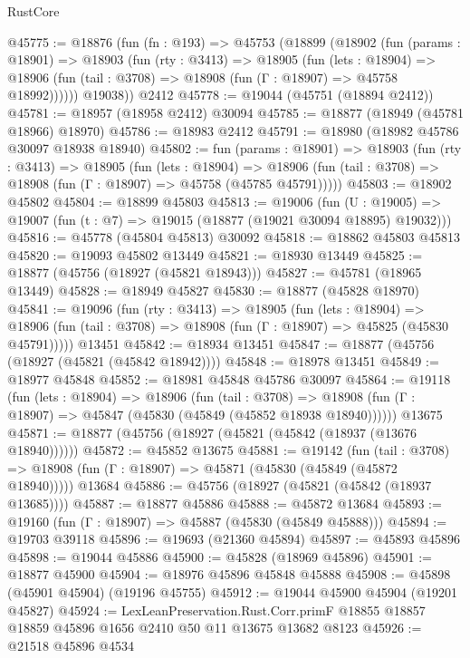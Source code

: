 \begin{lexlean}{RustCore}
\begin{coremodule}
@45775 := @18876
    (fun (fn : @193) =>
    @45753
      (@18899
        (@18902
          (fun (params : @18901) =>
          @18903
            (fun (rty : @3413) =>
            @18905
              (fun (lets : @18904) =>
              @18906 (fun (tail : @3708) => @18908 (fun (Γ : @18907) => @45758 @18992))))))
        @19038))
    @2412
@45778 := @19044 (@45751 (@18894 @2412))
@45781 := @18957 (@18958 @2412) @30094
@45785 := @18877 (@18949 (@45781 @18966) @18970)
@45786 := @18983 @2412
@45791 := @18980 (@18982 @45786 @30097 @18938 @18940)
@45802 := fun (params : @18901) =>
  @18903
    (fun (rty : @3413) =>
    @18905
      (fun (lets : @18904) =>
      @18906 (fun (tail : @3708) => @18908 (fun (Γ : @18907) => @45758 (@45785 @45791)))))
@45803 := @18902 @45802
@45804 := @18899 @45803
@45813 := @19006
    (fun (U : @19005) => @19007 (fun (t : @7) => @19015 (@18877 (@19021 @30094 @18895) @19032)))
@45816 := @45778 (@45804 @45813) @30092
@45818 := @18862 @45803 @45813
@45820 := @19093 @45802 @13449
@45821 := @18930 @13449
@45825 := @18877 (@45756 (@18927 (@45821 @18943)))
@45827 := @45781 (@18965 @13449)
@45828 := @18949 @45827
@45830 := @18877 (@45828 @18970)
@45841 := @19096
    (fun (rty : @3413) =>
    @18905
      (fun (lets : @18904) =>
      @18906 (fun (tail : @3708) => @18908 (fun (Γ : @18907) => @45825 (@45830 @45791)))))
    @13451
@45842 := @18934 @13451
@45847 := @18877 (@45756 (@18927 (@45821 (@45842 @18942))))
@45848 := @18978 @13451
@45849 := @18977 @45848
@45852 := @18981 @45848 @45786 @30097
@45864 := @19118
    (fun (lets : @18904) =>
    @18906
      (fun (tail : @3708) =>
      @18908 (fun (Γ : @18907) => @45847 (@45830 (@45849 (@45852 @18938 @18940))))))
    @13675
@45871 := @18877 (@45756 (@18927 (@45821 (@45842 (@18937 (@13676 @18940))))))
@45872 := @45852 @13675
@45881 := @19142
    (fun (tail : @3708) => @18908 (fun (Γ : @18907) => @45871 (@45830 (@45849 (@45872 @18940)))))
    @13684
@45886 := @45756 (@18927 (@45821 (@45842 (@18937 @13685))))
@45887 := @18877 @45886
@45888 := @45872 @13684
@45893 := @19160 (fun (Γ : @18907) => @45887 (@45830 (@45849 @45888)))
@45894 := @19703 @39118
@45896 := @19693 (@21360 @45894)
@45897 := @45893 @45896
@45898 := @19044 @45886
@45900 := @45828 (@18969 @45896)
@45901 := @18877 @45900
@45904 := @18976 @45896 @45848 @45888
@45908 := @45898 (@45901 @45904) (@19196 @45755)
@45912 := @19044 @45900 @45904 (@19201 @45827)
@45924 := LexLeanPreservation.Rust.Corr.primF
    @18855
    @18857
    @18859
    @45896
    @1656
    @2410
    @50
    @11
    @13675
    @13682
    @8123
@45926 := @21518 @45896 @4534

\end{coremodule}
\end{lexlean}
